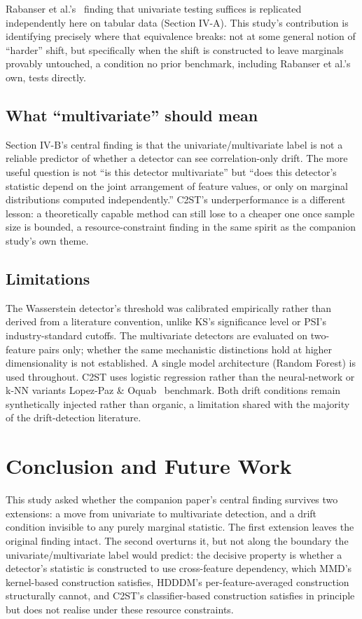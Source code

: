 \documentclass[conference]{IEEEtran}
\begin{document}
Rabanser et al.'s~\cite{rabanser2019} finding that univariate testing suffices is replicated independently here on tabular data (Section IV-A). This study's contribution is identifying precisely where that equivalence breaks: not at some general notion of ``harder'' shift, but specifically when the shift is constructed to leave marginals provably untouched, a condition no prior benchmark, including Rabanser et al.'s own, tests directly.

\subsection{What ``multivariate'' should mean}

Section IV-B's central finding is that the univariate/multivariate label is not a reliable predictor of whether a detector can see correlation-only drift. The more useful question is not ``is this detector multivariate'' but ``does this detector's statistic depend on the joint arrangement of feature values, or only on marginal distributions computed independently.'' C2ST's underperformance is a different lesson: a theoretically capable method can still lose to a cheaper one once sample size is bounded, a resource-constraint finding in the same spirit as the companion study's own theme.

\subsection{Limitations}

The Wasserstein detector's threshold was calibrated empirically rather than derived from a literature convention, unlike KS's significance level or PSI's industry-standard cutoffs. The multivariate detectors are evaluated on two-feature pairs only; whether the same mechanistic distinctions hold at higher dimensionality is not established. A single model architecture (Random Forest) is used throughout. C2ST uses logistic regression rather than the neural-network or k-NN variants Lopez-Paz \& Oquab~\cite{lopezpaz2017} benchmark. Both drift conditions remain synthetically injected rather than organic, a limitation shared with the majority of the drift-detection literature.

\section{Conclusion and Future Work}
\label{sec:conclusion}

This study asked whether the companion paper's central finding survives two extensions: a move from univariate to multivariate detection, and a drift condition invisible to any purely marginal statistic. The first extension leaves the original finding intact. The second overturns it, but not along the boundary the univariate/multivariate label would predict: the decisive property is whether a detector's statistic is constructed to use cross-feature dependency, which MMD's kernel-based construction satisfies, HDDDM's per-feature-averaged construction structurally cannot, and C2ST's classifier-based construction satisfies in principle but does not realise under these resource constraints.
\end{document}

